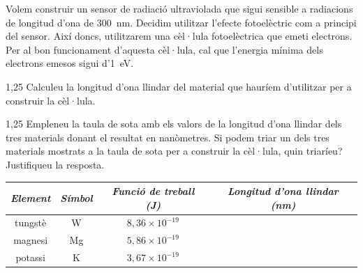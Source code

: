 Volem construir un sensor de radiació ultraviolada que sigui sensible a radiacions de longitud d'ona de 300~nm. Decidim utilitzar l'efecte fotoelèctric com a principi del sensor. Així doncs, utilitzarem una cèl·lula fotoelèctrica que emeti electrons. Per al bon funcionament d'aquesta cèl·lula, cal que l'energia mínima dels electrons emesos sigui d'1~eV.

\begin{apartat}{1,25}
Calculeu la longitud d'ona llindar del material que hauríem d'utilitzar per a construir la cèl·lula.
\end{apartat}

\begin{apartat}{1,25}
Empleneu la taula de sota amb els valors de la longitud d'ona llindar dels tres materials donant el resultat en nanòmetres. Si podem triar un dels tres materials mostrats a la taula de sota per a construir la cèl·lula, quin triaríeu? Justifiqueu la resposta.
\end{apartat}

\begin{center}
\begin{tabular}{|c|c|c|c|}
\hline
\textit{Element} & \textit{Símbol} & \textit{Funció de treball (J)} & \textit{Longitud d'ona llindar (nm)} \\
\hline
tungstè & W & $8,36\times 10^{-19}$ & \\
\hline
magnesi & Mg & $5,86\times 10^{-19}$ & \\
\hline
potassi & K & $3,67\times 10^{-19}$ & \\
\hline
\end{tabular}
\end{center}

